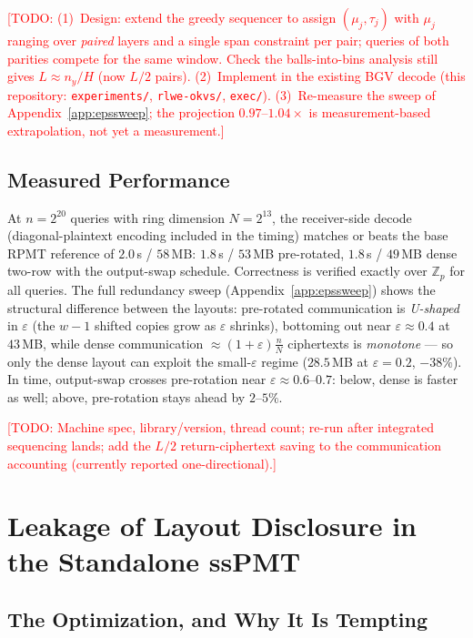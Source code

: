 \documentclass[runningheads]{llncs}
\newcommand{\TODO}[1]{\textcolor{red}{[TODO: #1]}}
\newcommand{\Zp}{\mathbb{Z}_p}
\newcommand{\band}{w}                        %
\newcommand{\eps}{\varepsilon}               %
\newcommand{\half}{H}                        %
\begin{document}
\TODO{(1)~Design: extend the greedy sequencer to assign $(\mu_j,\tau_j)$ with
$\mu_j$ ranging over \emph{paired} layers and a single span constraint per pair;
queries of both parities compete for the same window. Check the balls-into-bins
analysis still gives $L\approx n_y/\half$ (now $L/2$ pairs). (2)~Implement in the
existing BGV decode (this repository: \texttt{experiments/}, \texttt{rlwe-okvs/},
\texttt{exec/}).
(3)~Re-measure the sweep of Appendix~\ref{app:epssweep}; the projection
$0.97$--$1.04\times$ is measurement-based extrapolation, not yet a measurement.}

\subsection{Measured Performance}
\label{sec:dense:eval}

At $n=2^{20}$ queries with ring dimension $N=2^{13}$, the receiver-side decode
(diagonal-plaintext encoding included in the timing) matches or beats the base RPMT
reference of $2.0$\,s / $58$\,MB: $1.8$\,s / $53$\,MB pre-rotated, $1.8$\,s /
$49$\,MB dense two-row with the output-swap schedule. Correctness is verified exactly
over $\Zp$ for all queries. The full redundancy sweep (Appendix~\ref{app:epssweep})
shows the structural difference between the layouts: pre-rotated communication is
\emph{U-shaped} in $\eps$ (the $\band{-}1$ shifted copies grow as $\eps$ shrinks),
bottoming out near $\eps\approx0.4$ at $43$\,MB, while dense communication
$\approx(1+\eps)\tfrac nN$ ciphertexts is \emph{monotone} --- so only the dense
layout can exploit the small-$\eps$ regime ($28.5$\,MB at $\eps=0.2$, $-38\%$). In
time, output-swap crosses pre-rotation near $\eps\approx0.6$--$0.7$: below, dense is
faster as well; above, pre-rotation stays ahead by $2$--$5\%$.

\TODO{Machine spec, library/version, thread count; re-run after integrated
sequencing lands; add the $L/2$ return-ciphertext saving to the communication
accounting (currently reported one-directional).}

\section{Leakage of Layout Disclosure in the Standalone ssPMT}
\label{sec:leak}

\subsection{The Optimization, and Why It Is Tempting}
\label{sec:leak:setting}
\end{document}
